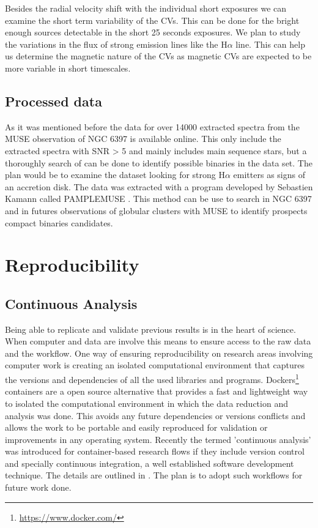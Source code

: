 Besides the radial velocity shift with the individual short exposures we can examine the short term variability of the CVs. This can be done for the bright enough sources detectable in the short 25 seconds exposures. We plan to study the variations in the flux of strong emission lines like the H$\alpha$ line. This can help us determine the magnetic nature of the CVs as magnetic CVs are expected to be more variable in short timescales. 

\subsection{Processed data}

As it was mentioned before the data for over 14000 extracted spectra from the MUSE observation of NGC 6397 is available online. This only include the extracted spectra with SNR > 5 and mainly includes main sequence stars, but a thoroughly search of can be done to identify possible binaries in the data set. The plan would be to examine the dataset looking for strong H$\alpha$ emitters as signs of an accretion disk. The data was extracted with a program developed by Sebastien Kamann called PAMPLEMUSE \citep{2013A&A...549A..71K}. This method can be use  to search in NGC 6397 and in futures observations of globular clusters with MUSE to identify prospects compact binaries candidates. 


\section{Reproducibility}


\subsection{Continuous Analysis}


Being able to replicate and validate previous results is in the heart of science. When computer and data are involve this means to ensure access to the raw data and the workflow. One way of ensuring reproducibility on research areas involving computer work is creating an isolated computational environment that captures the versions and dependencies of all the used libraries and programs. Dockers\footnote{\url{https://www.docker.com/}} containers are a open source alternative that provides a fast and lightweight way to isolated the computational environment in which the data reduction and analysis was done. This  avoids any future dependencies or versions conflicts and allows the work to be portable and easily reproduced for validation or improvements in any operating system. Recently the termed 'continuous analysis' was introduced for container-based research flows if they include version control and specially continuous integration, a well established software development technique. The details are outlined in \cite{Beaulieu-Jones056473}. The plan is to adopt such workflows for future work done.   

